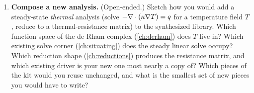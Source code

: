 \begin{enumerate}[nosep]
  enter, and argue whether it would change the \emph{structure} of the tree or only the
  implementation of a leaf. Why does the book claim sharding ``composes with the pure
  picture rather than fighting it''? What is the risk that gates it as future work?
  \item \textbf{Compose a new analysis.} (Open-ended.) Sketch how you would add a
  steady-state \emph{thermal} analysis (solve $-\nabla\cdot(\kappa\nabla T)=q$ for a temperature
  field $T$, reduce to a thermal-resistance matrix) to the synthesized library. Which
  function space of the de Rham complex (\cref{ch:derham}) does $T$ live in? Which existing
  solve corner (\cref{ch:situating}) does the steady linear solve occupy? Which reduction
  shape (\cref{ch:reductions}) produces the resistance matrix, and which existing driver is
  your new one most nearly a copy of? Which pieces of the kit would you reuse unchanged, and
  what is the smallest set of new pieces you would have to write?
\end{enumerate}
